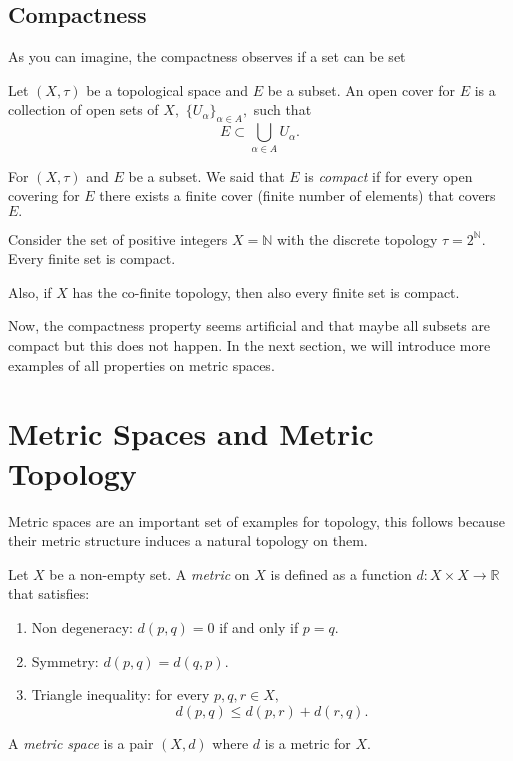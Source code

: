 \documentclass[
	fontsize=10pt, %
	twoside=false, %
	secnumdepth=1, %
]{kaobook}
\begin{document}
\subsection{Compactness}

As you can imagine, the compactness observes if a set can be set 


\begin{definition}
Let $(X,\tau)$ be a topological space and $E$ be a subset. An open cover for $E$ is a collection of open sets of $X,$ $\{U_\alpha\}_{\alpha\in A},$ such that $$E\subset \bigcup_{\alpha\in A} U_\alpha.$$
\end{definition}

\begin{definition}
For $(X,\tau)$ and $E$ be a subset. We said that $E$ is \emph{compact} if for every open covering for $E$ there exists a finite cover (finite number of elements) that covers $E.$
\end{definition}

\begin{example}
Consider the set of positive integers $X=\mathbb{N}$ with the discrete topology $\tau=2^{\mathbb{N}}.$ Every finite set is compact. 

Also, if $X$ has the co-finite topology, then also every finite set is compact.
\end{example}

Now, the compactness property seems artificial and that maybe all subsets are compact but this does not happen. In the next section, we will introduce more examples of all properties on metric spaces.

\section{Metric Spaces and Metric Topology}

Metric spaces are an important set of examples for topology, this follows because their metric structure induces a natural topology on them.

\begin{definition}
Let $X$ be a non-empty set. A \emph{metric} on $X$ is defined as a function $d:X\times X\to \mathbb{R}$ that satisfies:
\begin{enumerate}
\item Non degeneracy: $d(p,q)=0$ if and only if $p=q.$
\item Symmetry: $d(p,q)=d(q,p).$
\item Triangle inequality: for every $p,q,r\in X,$ $$d(p,q)\leq d(p,r)+d(r,q).$$
\end{enumerate}

A \emph{metric space} is a pair $(X,d)$ where $d$ is a metric for $X.$
\end{definition}
\end{document}
